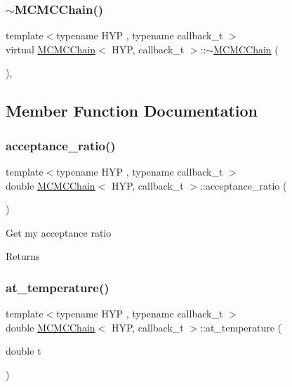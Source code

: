 \subsubsection{\texorpdfstring{$\sim$\+M\+C\+M\+C\+Chain()}{~MCMCChain()}}
{\footnotesize\ttfamily template$<$typename H\+YP , typename callback\+\_\+t $>$ \\
virtual \hyperlink{class_m_c_m_c_chain}{M\+C\+M\+C\+Chain}$<$ H\+YP, callback\+\_\+t $>$\+::$\sim$\hyperlink{class_m_c_m_c_chain}{M\+C\+M\+C\+Chain} (\begin{DoxyParamCaption}{ }\end{DoxyParamCaption})\hspace{0.3cm}{\ttfamily [inline]}, {\ttfamily [virtual]}}



\subsection{Member Function Documentation}
\mbox{\label{class_m_c_m_c_chain_a4b2b8b51e5ba868bca024f2be737e4c6}} 
\subsubsection{\texorpdfstring{acceptance\+\_\+ratio()}{acceptance\_ratio()}}
{\footnotesize\ttfamily template$<$typename H\+YP , typename callback\+\_\+t $>$ \\
double \hyperlink{class_m_c_m_c_chain}{M\+C\+M\+C\+Chain}$<$ H\+YP, callback\+\_\+t $>$\+::acceptance\+\_\+ratio (\begin{DoxyParamCaption}{ }\end{DoxyParamCaption})\hspace{0.3cm}{\ttfamily [inline]}}

Get my acceptance ratio \begin{DoxyReturn}{Returns}

\end{DoxyReturn}
\mbox{\label{class_m_c_m_c_chain_a9adc3d08662ad7035cc9d9d75a1fc5a6}} 
\subsubsection{\texorpdfstring{at\+\_\+temperature()}{at\_temperature()}}
{\footnotesize\ttfamily template$<$typename H\+YP , typename callback\+\_\+t $>$ \\
double \hyperlink{class_m_c_m_c_chain}{M\+C\+M\+C\+Chain}$<$ H\+YP, callback\+\_\+t $>$\+::at\+\_\+temperature (\begin{DoxyParamCaption}\item[{double}]{t }\end{DoxyParamCaption})\hspace{0.3cm}{\ttfamily [inline]}}

